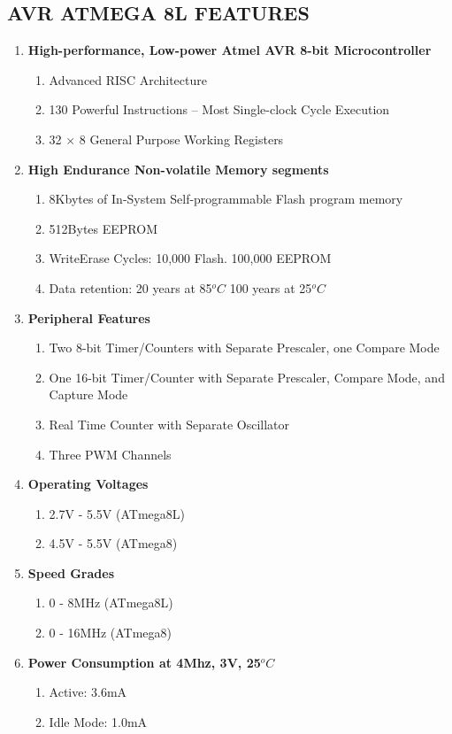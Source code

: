 \documentclass[12pt, a4paper]{article}
\begin{document}
\begin{appendices}
\section{AVR ATMEGA 8L FEATURES}
\begin{enumerate}
\item \textbf{High-performance, Low-power Atmel AVR 8-bit Microcontroller}
\begin{enumerate}
\item Advanced \ac{RISC} Architecture
\item 130 Powerful Instructions – Most Single-clock Cycle Execution
\item 32 × 8 General Purpose Working Registers
\end{enumerate}
\item \textbf{High Endurance Non-volatile Memory segments}
\begin{enumerate}
\item 8Kbytes of In-System Self-programmable Flash program memory
\item 512Bytes EEPROM
\item WriteErase Cycles: 10,000 Flash. 100,000 \ac{EEPROM}
\item Data retention: 20 years at 85$^oC$ 100 years at 25$^oC$
\end{enumerate}
\item \textbf{Peripheral Features}
\begin{enumerate}
\item Two 8-bit Timer/Counters with Separate Prescaler, one Compare Mode
\item One 16-bit Timer/Counter with Separate Prescaler, Compare Mode, and Capture Mode
\item Real Time Counter with Separate Oscillator
\item Three PWM Channels
\end{enumerate}
\item \textbf{Operating Voltages}
\begin{enumerate}
\item 2.7V - 5.5V (ATmega8L)
\item 4.5V - 5.5V (ATmega8)
\end{enumerate}
\item \textbf{Speed Grades}
\begin{enumerate}
\item 0 - 8MHz (ATmega8L)
\item 0 - 16MHz (ATmega8)
\end{enumerate}
\item \textbf{Power Consumption at 4Mhz, 3V, 25$^oC$}
\begin{enumerate}
\item Active: 3.6mA
\item Idle Mode: 1.0mA
\end{enumerate}
\end{enumerate}
\newpage


\end{appendices}
\end{document}
